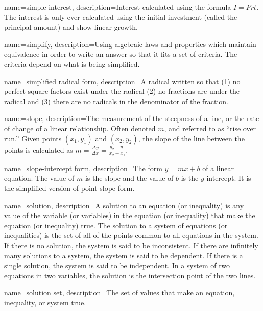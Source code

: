  {
	name=simple interest,
	description={Interest calculated using the formula $I = Prt$. The interest is only ever calculated using the initial investment (called the \gls{principal amount}) and show linear growth.}
}

 {
	name=simplify,
	description={Using algebraic laws and properties which maintain equivalence in order to write an answer so that it fits a set of criteria. The criteria depend on what is being simplified.}
}

 {
	name=simplified radical form,
	description={A radical written so that (1) no perfect square factors exist under the radical (2) no fractions are under the radical and (3) there are no radicals in the 
denominator of the fraction.}
}

 {
	name=slope,
	description={The measurement of the steepness of a line, or the rate of change of a linear relationship. Often denoted $m$, and referred to as ``rise over run.'' Given points $(x_1, y_1)$ and $(x_2, y_2)$, the slope of the line between the points is calculated as $m = \frac{\Delta y}{\Delta x} = \frac{y_2-y_1}{x_2-x_1}$.}
}

 {
	name=slope-intercept form,
	description={The form $y = mx +b$ of a linear equation. The value of $m$ is the slope and the value of $b$ is the $y$-intercept. It is the simplified version of \gls{point-slope form}.}
}

 {
	name=solution,
	description={A solution to an equation (or inequality) is any value of the variable (or variables) in the equation (or inequality) that make the equation (or inequality) true. The solution to a system of equations (or inequalities) is the set of all of the points common to all equations in the system. If there is no solution, the system is said to be inconsistent. If there are infinitely many solutions to a system, the system is said to be dependent. If there is a single solution, the system is said to be independent. In a system of two equations in two variables, the solution is the intersection point of the two lines.}
}

 {
	name=solution set,
	description={The set of values that make an equation, inequality, or system true.}
}


